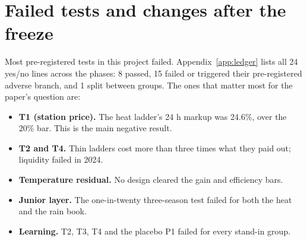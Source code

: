 \documentclass[11pt]{article}
\begin{document}
\section{Failed tests and changes after the freeze}
\label{sec:failures}

Most pre-registered tests in this project failed. Appendix~\ref{app:ledger} lists all 24 yes/no lines across the phases: 8 passed, 15 failed or triggered their pre-registered adverse branch, and 1 split between groups. The ones that matter most for the paper's question are:
\begin{itemize}
\item \textbf{T1 (station price).} The heat ladder's 24 h markup was 24.6\%, over the 20\% bar. This is the main negative result.
\item \textbf{T2 and T4.} Thin ladders cost more than three times what they paid out; liquidity failed in 2024.
\item \textbf{Temperature residual.} No design cleared the gain and efficiency bars.
\item \textbf{Junior layer.} The one-in-twenty three-season test failed for both the heat and the rain book.
\item \textbf{Learning.} T2, T3, T4 and the placebo P1 failed for every stand-in group.
\end{itemize}
\end{document}
